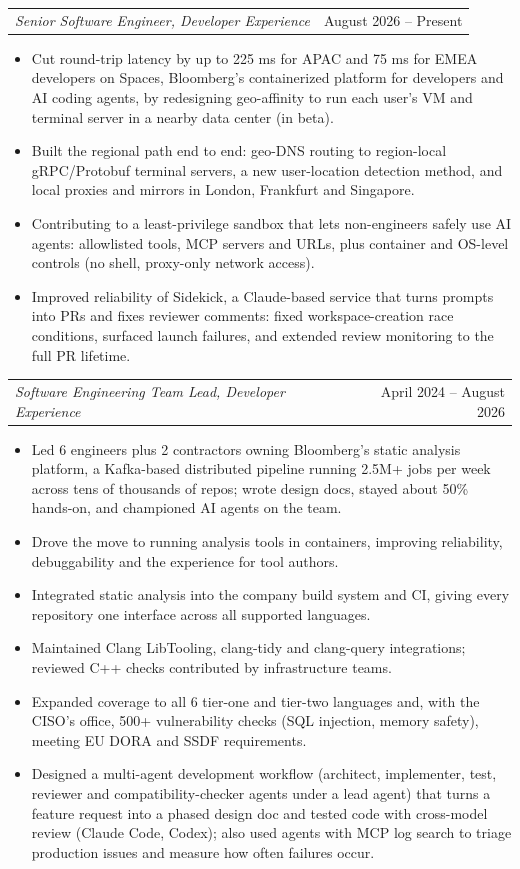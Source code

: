\documentclass[letterpaper,11pt]{article}
\makeatletter
\newcommand{\resumeItem}[1]{
  \item\small{
    {#1 \vspace{-2pt}}
  }
}
\newcommand{\resumeRole}[2]{
  \vspace{1pt}\item
    \begin{tabular*}{0.97\textwidth}{l@{\extracolsep{\fill}}r}
      \textit{\small#1} & {\small #2} \\
    \end{tabular*}\vspace{-7pt}
}
\newcommand{\resumeItemListStart}{\begin{itemize}}
\newcommand{\resumeItemListEnd}{\end{itemize}\vspace{-5pt}}
\makeatother
\begin{document}
     \resumeRole
      {Senior Software Engineer, Developer Experience}{August 2026 -- Present}
      \resumeItemListStart
        \resumeItem{Cut round-trip latency by up to 225 ms for APAC and 75 ms for EMEA developers on Spaces, Bloomberg's containerized platform for developers and AI coding agents, by redesigning geo-affinity to run each user's VM and terminal server in a nearby data center (in beta).}
        \resumeItem{Built the regional path end to end: geo-DNS routing to region-local gRPC/Protobuf terminal servers, a new user-location detection method, and local proxies and mirrors in London, Frankfurt and Singapore.}
        \resumeItem{Contributing to a least-privilege sandbox that lets non-engineers safely use AI agents: allowlisted tools, MCP servers and URLs, plus container and OS-level controls (no shell, proxy-only network access).}
        \resumeItem{Improved reliability of Sidekick, a Claude-based service that turns prompts into PRs and fixes reviewer comments: fixed workspace-creation race conditions, surfaced launch failures, and extended review monitoring to the full PR lifetime.}
      \resumeItemListEnd

     \resumeRole
      {Software Engineering Team Lead, Developer Experience}{April 2024 -- August 2026}
      \resumeItemListStart
        \resumeItem{Led 6 engineers plus 2 contractors owning Bloomberg's static analysis platform, a Kafka-based distributed pipeline running 2.5M+ jobs per week across tens of thousands of repos; wrote design docs, stayed about 50\% hands-on, and championed AI agents on the team.}
        \resumeItem{Drove the move to running analysis tools in containers, improving reliability, debuggability and the experience for tool authors.}
        \resumeItem{Integrated static analysis into the company build system and CI, giving every repository one interface across all supported languages.}
        \resumeItem{Maintained Clang LibTooling, clang-tidy and clang-query integrations; reviewed C++ checks contributed by infrastructure teams.}
        \resumeItem{Expanded coverage to all 6 tier-one and tier-two languages and, with the CISO's office, 500+ vulnerability checks (SQL injection, memory safety), meeting EU DORA and SSDF requirements.}
        \resumeItem{Designed a multi-agent development workflow (architect, implementer, test, reviewer and compatibility-checker agents under a lead agent) that turns a feature request into a phased design doc and tested code with cross-model review (Claude Code, Codex); also used agents with MCP log search to triage production issues and measure how often failures occur.}
      \resumeItemListEnd
\end{document}
